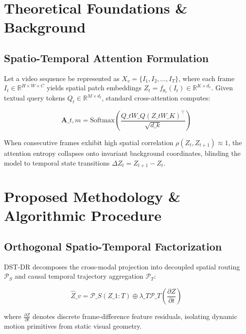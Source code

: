 \documentclass[10pt,twocolumn,letterpaper]{article}
\begin{document}
\section{Theoretical Foundations \& Background}



\subsection{Spatio-Temporal Attention Formulation}

Let a video sequence be represented as $X_v = \{I_1, I_2, \dots, I_T\}$, where each frame $I_t \in \mathbb{R}^{H \times W \times C}$ yields spatial patch embeddings $Z_t = f_{\theta_v}(I_t) \in \mathbb{R}^{K \times d_v}$. Given textual query tokens $Q_t \in \mathbb{R}^{M \times d_t}$, standard cross-attention computes:

\begin{equation}
\label{eq:standard\_cross\_attn}
\mathbf{A}\_{t, m} = \text{Softmax}\left( \frac{Q\_t W\_Q (Z\_t W\_K)^\top}{\sqrt{d\_k}} \right)
\end{equation}

When consecutive frames exhibit high spatial correlation $\rho(Z_t, Z_{t+1}) \approx 1$, the attention entropy collapses onto invariant background coordinates, blinding the model to temporal state transitions $\Delta Z_t = Z_{t+1} - Z_t$.




\section{Proposed Methodology \& Algorithmic Procedure}



\subsection{Orthogonal Spatio-Temporal Factorization}

DST-DR decomposes the cross-modal projection into decoupled spatial routing $\mathcal{P}_S$ and causal temporal trajectory aggregation $\mathcal{P}_T$:

\begin{equation}
\label{eq:decoupled\_routing}
\hat{Z}\_v = \mathcal{P}\_S(Z\_{1:T}) \oplus \lambda\_T \mathcal{P}\_T\left(\frac{\partial Z}{\partial t}\right)
\end{equation}

where $\frac{\partial Z}{\partial t}$ denotes discrete frame-difference feature residuals, isolating dynamic motion primitives from static visual geometry.
\end{document}
